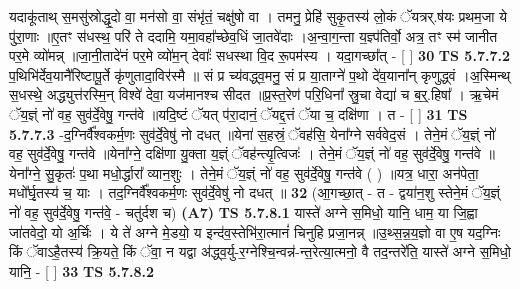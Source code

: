 \documentclass[17pt]{extarticle}
\begin{document}
                  यदाकू॑ताथ् स॒मसु॑स्रोद्धृ॒दो वा॒ मन॑सो वा॒ संभृ॑तं॒ चक्षु॑षो वा । तमनु॒ प्रेहि॑ सुकृ॒तस्य॑ लो॒कं ॅयत्रर्.ष॑यः प्रथम॒जा ये पु॑रा॒णाः ॥ए॒तꣳ स॑धस्थ॒ परि॑ ते ददामि॒ यमा॒वहा᳚च्छेव॒धिं जा॒तवे॑दाः ।अ॒न्वा॒ग॒न्ता य॒ज्ञ्प॑तिर्वो॒ अत्र॒ तꣳ स्म॑ जानीत पर॒मे व्यो॑मन्न् ॥जा॒नी॒तादे॑नं पर॒मे व्यो॑म॒न् देवाः᳚ सधस्था वि॒द रू॒पम॑स्य । यदा॒गच्छा᳚त् - [  ] \textbf{  30} \newline
                  \newline
                                \textbf{ TS 5.7.7.2} \newline
                  प॒थिभि॑र्देव॒यानै॑रिष्टापू॒र्ते कृ॑णुतादा॒विर॑स्मै ॥ सं प्र च्य॑वद्ध्व॒मनु॒ सं प्र या॒ताग्ने॑ प॒थो दे॑व॒याना᳚न् कृणुद्ध्वं ।अ॒स्मिन्थ् स॒धस्थे॒ अद्ध्युत्त॑रस्मि॒न् विश्वे॑ देवा॒ यज॑मानश्च सीदत ॥प्र॒स्त॒रेण॑ परि॒धिना᳚ स्रु॒चा वेद्या॑ च ब॒र्॒.हिषा᳚ । ऋ॒चेमं ॅय॒ज्ञ्ं नो॑ वह॒ सुव॑र्दे॒वेषु॒ गन्त॑वे ॥यदि॒ष्टं ॅयत् प॑रा॒दानं॒ ॅयद्द॒त्तं ॅया च॒ दक्षि॑णा । त - [  ] \textbf{  31} \newline
                  \newline
                                \textbf{ TS 5.7.7.3} \newline
                  -द॒ग्निर्वै᳚श्वकर्म॒णः सुव॑र्दे॒वेषु॑ नो दधत् ॥येना॑ स॒हस्रं॒ ॅवह॑सि॒ येना᳚ग्ने सर्ववेद॒सं । तेने॒मं ॅय॒ज्ञ्ं नो॑ वह॒ सुव॑र्दे॒वेषु॒ गन्त॑वे ॥येना᳚ग्ने॒ दक्षि॑णा यु॒क्ता य॒ज्ञ्ं ॅवह॑न्त्यृ॒त्विजः॑ । तेने॒मं ॅय॒ज्ञ्ं नो॑ वह॒ सुव॑र्दे॒वेषु॒ गन्त॑वे ॥येना᳚ग्ने॒ सु॒कृतः॑ प॒था मधो॒र्द्धारा᳚ व्यान॒शुः । तेने॒मं ॅय॒ज्ञ्ं नो॑ वह॒ सुव॑र्दे॒वेषु॒ गन्त॑वे ( ) ॥यत्र॒ धारा॒ अन॑पेता॒ मधो᳚र्घृ॒तस्य॑ च॒ याः । तद॒ग्निर्वै᳚श्वकर्म॒णः सुव॑र्दे॒वेषु॑ नो दधत् ॥ \textbf{  32} \newline
                  \newline
                      (आ॒गच्छा॒त् - त - द्वया॑न॒शु स्तेने॒मं ॅय॒ज्ञ्ं नो॑ वह॒ सुव॑र्दे॒वेषु॒ गन्त॑वे॒ - चतु॑र्दश च)  \textbf{(A7)} \newline \newline
                                        \textbf{ TS 5.7.8.1} \newline
                  यास्ते॑ अग्ने स॒मिधो॒ यानि॒ धाम॒ या जि॒ह्वा जा॑तवेदो॒ यो अ॒र्चिः । ये ते॑ अग्ने मे॒डयो॒ य इन्द॑व॒स्तेभि॑रा॒त्मानं॑ चिनुहि प्रजा॒नन्न् ॥उ॒थ्स॒न्न॒य॒ज्ञो वा ए॒ष यद॒ग्निः किं ॅवाऽहै॒तस्य॑ क्रि॒यते॒ किं ॅवा॒ न यद्वा अ॑द्ध्व॒र्यु-र॒ग्नेश्चि॒न्वन्न॑-न्त॒रेत्या॒त्मनो॒ वै तद॒न्तरे॑ति॒ यास्ते॑ अग्ने स॒मिधो॒ यानि॒ - [  ] \textbf{  33} \newline
                  \newline
                                \textbf{ TS 5.7.8.2} \newline
\end{document}
